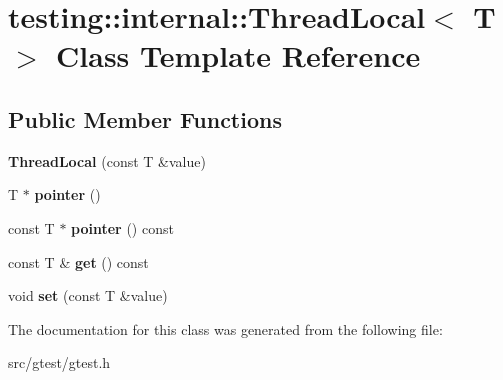 \hypertarget{classtesting_1_1internal_1_1_thread_local}{}\section{testing\+:\+:internal\+:\+:Thread\+Local$<$ T $>$ Class Template Reference}
\label{classtesting_1_1internal_1_1_thread_local}
\subsection*{Public Member Functions}
\begin{DoxyCompactItemize}
\item 
\mbox{\label{classtesting_1_1internal_1_1_thread_local_a85610bdfdbc93a4c56215e0aad7da870}} 
{\bfseries Thread\+Local} (const T \&value)
\item 
\mbox{\label{classtesting_1_1internal_1_1_thread_local_a882f57fed4b074de83693c0c0fe62858}} 
T $\ast$ {\bfseries pointer} ()
\item 
\mbox{\label{classtesting_1_1internal_1_1_thread_local_a57e45bb60e3cd94abb04fa449e9f0367}} 
const T $\ast$ {\bfseries pointer} () const
\item 
\mbox{\label{classtesting_1_1internal_1_1_thread_local_ac56aeb97991824979bf192c63d1466f8}} 
const T \& {\bfseries get} () const
\item 
\mbox{\label{classtesting_1_1internal_1_1_thread_local_ab5ebc7ba07426cef7167afa2a7707eb4}} 
void {\bfseries set} (const T \&value)
\end{DoxyCompactItemize}


The documentation for this class was generated from the following file\+:\begin{DoxyCompactItemize}
\item 
src/gtest/gtest.\+h\end{DoxyCompactItemize}
